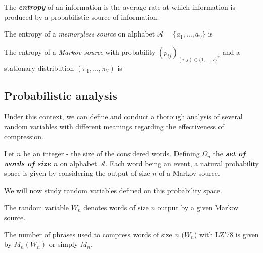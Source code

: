     \begin{df}
        \label{def:entropy}
        The \emph{\bfseries entropy} of an information is the average
        rate at which information is produced by a probabilistic
        source of information.
    \end{df}

    \begin{prop}
        \label{prop:memorylessentropy}
        The entropy of a \emph{memoryless source} on 
        alphabet $\mathcal{A} = \{ a_1,\dots,a_V \}$ is
    \end{prop}

    \begin{prop}
        \label{prop:markoventropy}
        The entropy of a \emph{Markov source} with probability
        $(p_{i j})_{(i, j) \in { \{1,\dots,V\} }^2} $ and a 
        stationary distribution $(\pi_1, \dots, \pi_V)$ is
    \end{prop}

    
\subsection{Probabilistic analysis }

Under this context, we can define and conduct a thorough
analysis of several random variables with different meanings
regarding the effectiveness of compression.

\begin{nota}
    \label{nota:universe}
    Let $n$ be an integer - the size of the considered words.
    Defining $\Omega_n$ the \emph{\bfseries set of words of size $n$} on alphabet
    $\mathcal{A}$. Each word being an event, a natural probability
    space is given by considering the output of size $n$ of a Markov
    source.
\end{nota}

\begin{rmk}
    \label{rmk:probaspace}
    We will now study random variables defined 
    on this probability space. 
\end{rmk}

\begin{nota}
    \label{nota:output}
    The random variable $W_n$ denotes words of size $n$ output by a given Markov source.
\end{nota}

\begin{nota}
    \label{nota:numberphrases}
    The number of phrases used to compress words of size $n$ ($W_n$) with
    LZ'78 is given by $M_n(W_n)$ or simply $M_n$.
\end{nota}

